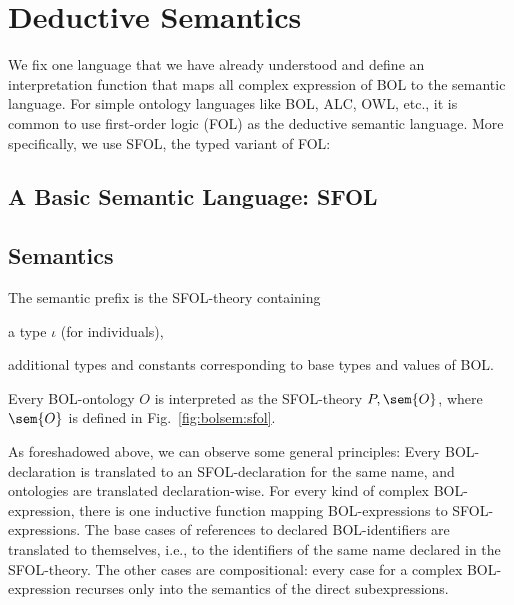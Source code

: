 \section{Deductive Semantics}\label{sec:bolsem:ded}

We fix one language that we have already understood and define an interpretation function that maps all complex expression of BOL to the semantic language.
For simple ontology languages like BOL, ALC, OWL, etc., it is common to use first-order logic (FOL) as the deductive semantic language.
More specifically, we use SFOL, the typed variant of FOL:

\subsection{A Basic Semantic Language: SFOL}\label{sec:wuv:tfol}
  

\subsection{Semantics}

\begin{definition}\label{def:bolsem:sfol}
The semantic prefix is the SFOL-theory containing
\begin{compactitem}
 \item a type $\iota$ (for individuals),
 \item additional types and constants corresponding to base types and values of BOL.
\end{compactitem}

Every BOL-ontology $O$ is interpreted as the SFOL-theory $P,\sem{O}$, where $\sem{O}$ is defined in Fig.~\ref{fig:bolsem:sfol}.
\end{definition}

As foreshadowed above, we can observe some general principles:
Every BOL-declaration is translated to an SFOL-declaration for the same name, and ontologies are translated declaration-wise.
For every kind of complex BOL-expression, there is one inductive function mapping BOL-expressions to SFOL-expressions.
The base cases of references to declared BOL-identifiers are translated to themselves, i.e., to the identifiers of the same name declared in the SFOL-theory.
The other cases are compositional: every case for a complex BOL-expression recurses only into the semantics of the direct subexpressions.

